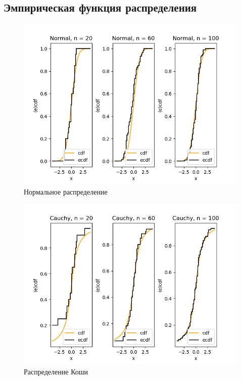 \documentclass[../body.tex]{subfiles}
\begin{document}
\subsection{Эмпирическая функция распределения}

\begin{figure}[H]
	\centering
	\includegraphics[width=\textwidth, height =0.4\textheight]{img/NormalCDF.png}
	\caption{Нормальное распределение}
	\label{fig:normal_cdf}
\end{figure}

\begin{figure}[H]
	\centering
	\includegraphics[width=\textwidth, height =0.4\textheight]{img/CauchyCDF.png}
	\caption{Распределение Коши}
	\label{fig:cauchy_cdf}
\end{figure}
\end{document}
